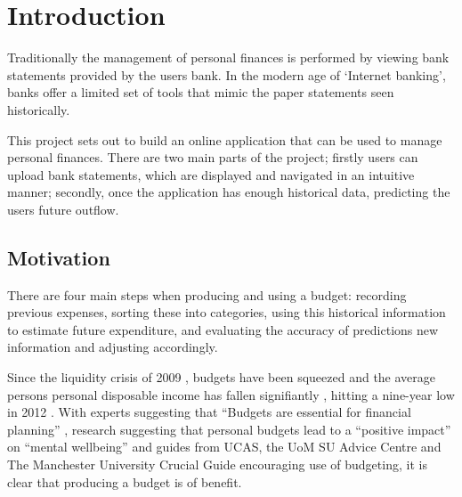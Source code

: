 \chapter{Introduction}
\label{cha:introduction}

\begin{comment}
This chapter puts the work into context. Having read it, the reader should be left in no doubt as to:

- the topic area to which the work applies
- why the work is being done
- what else has been done in the area and by whom
 - how the author proposes to tackle the problem: The project proposal is often expressed in terms of a main objective and possibly one or more additional objectives. It is useful to define "milestones" or "sub-goals" that mark the progress towards the objectives. 
 - It is common to end this chapter with a brief overview of each of the subsequent chapters of the report.
\end{comment}

Traditionally the management of personal finances is performed by viewing bank statements provided by the users bank. In the modern age of `Internet banking', banks offer a limited set of tools that mimic the paper statements seen historically.

This project sets out to build an online application that can be used to manage personal finances. There are two main parts of the project; firstly users can upload bank statements, which are displayed and navigated in an intuitive manner; secondly, once the application has enough historical data, predicting the users future outflow.

\section{Motivation}
There are four main steps when producing and using a budget: recording previous expenses, sorting these into categories, using this historical information to estimate future expenditure, and evaluating the accuracy of predictions new information and adjusting accordingly.

Since the liquidity crisis of 2009 \parencite{gore2010}, budgets have been squeezed and the average persons personal disposable income has fallen signifiantly , hitting a nine-year low in 2012 \parencite{barnard2012households}. With experts suggesting that ``Budgets are essential for financial planning'' \parencite{wsj2013budget}, research suggesting that personal budgets lead to a ``positive impact'' on ``mental wellbeing'' \parencite{tlap2013budget} and guides from UCAS, the UoM SU Advice Centre and The Manchester University Crucial Guide encouraging use of budgeting, it is clear that producing a budget is of benefit. 

